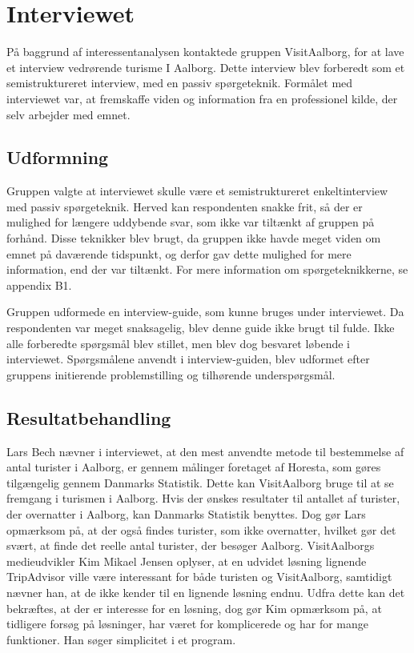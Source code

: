 \section{Interviewet}
På baggrund af interessentanalysen kontaktede gruppen VisitAalborg, for at lave et interview vedrørende turisme I Aalborg. Dette interview blev forberedt som et semistruktureret interview, med en passiv spørgeteknik. Formålet med interviewet var, at fremskaffe viden og information fra en professionel kilde, der selv arbejder med emnet.

\subsection{Udformning}
Gruppen valgte at interviewet skulle være et semistruktureret enkeltinterview med passiv spørgeteknik. Herved kan respondenten snakke frit, så der er mulighed for længere uddybende svar, som ikke var tiltænkt af gruppen på forhånd. Disse teknikker blev brugt, da gruppen ikke havde meget viden om emnet på daværende tidspunkt, og derfor gav dette mulighed for mere information, end der var tiltænkt. For mere information om spørgeteknikkerne, se appendix B1.

Gruppen udformede en interview-guide, som kunne bruges under interviewet. Da respondenten var meget snaksagelig, blev denne guide ikke brugt til fulde. Ikke alle forberedte spørgsmål blev stillet, men blev dog besvaret løbende i interviewet. Spørgsmålene anvendt i interview-guiden, blev udformet efter gruppens initierende problemstilling og tilhørende underspørgsmål.

\subsection{Resultatbehandling}
Lars Bech nævner i interviewet, at den mest anvendte metode til bestemmelse af antal turister i Aalborg, er gennem målinger foretaget af Horesta, som gøres tilgængelig gennem Danmarks Statistik. Dette kan VisitAalborg bruge til at se fremgang i turismen i Aalborg. Hvis der ønskes resultater til antallet af turister, der overnatter i Aalborg, kan Danmarks Statistik benyttes. Dog gør Lars opmærksom på, at der også findes turister, som ikke overnatter, hvilket gør det svært, at finde det reelle antal turister, der besøger Aalborg.
VisitAalborgs medieudvikler Kim Mikael Jensen oplyser, at en udvidet løsning lignende TripAdvisor ville være interessant for både turisten og VisitAalborg, samtidigt nævner han, at de ikke kender til en lignende løsning endnu. Udfra dette kan det bekræftes, at der er interesse for en løsning, dog gør Kim opmærksom på, at tidligere forsøg på løsninger, har været for komplicerede og har for mange funktioner. Han søger simplicitet i et program.

